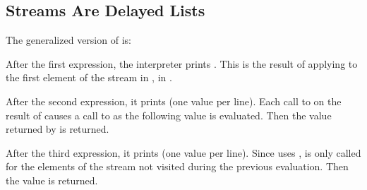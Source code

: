 \subsection{Streams Are Delayed Lists}

\begin{exe}[3.50]
    The generalized version of  is:
\end{exe}

\begin{exe}[3.51]
    After the first expression, the interpreter prints . This is the 
    result of applying  to the first element of the stream in 
    , in .

    After the second expression, it prints  (one value per 
    line). Each call to  on the result of  
    causes a call to  as the following value is evaluated. Then the 
    value returned by  is returned.

    After the third expression, it prints  (one value per line). 
    Since  uses ,  is only called for the 
    elements of the stream not visited during the previous evaluation. Then the 
    value  is returned.
\end{exe}

